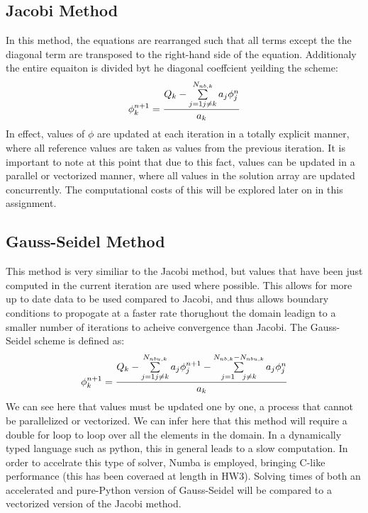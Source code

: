 \documentclass[11pt]{article}
\begin{document}
\subsection{Jacobi Method}
\label{sec-1-2}
In this method, the equations are rearranged such that all terms except the the diagonal term are transposed to the right-hand side of the equation. Additionaly the entire equaiton is divided byt he diagonal coeffcient yeilding the scheme:
\[
\phi_{k}^{n+1} = \frac{Q_{k} - \sum\limits_{j=1 \\ j \neq k}^{N_{nb,k}} a_{j} \phi_{j}^{n}}{a_{k}}
\]
In effect, values of $\phi$ are updated at each iteration in a totally explicit manner, where all reference values are taken as values from the previous iteration. It is important to note at this point that due to this fact, values can be updated in a parallel or vectorized manner, where all values in the solution array are updated concurrently. The computational costs of this will be explored later on in this assignment.

\subsection{Gauss-Seidel Method}
\label{sec-1-3}
This method is very similiar to the Jacobi method, but values that have been just computed in the current iteration are used where possible. This allows for more up to date data to be used compared to Jacobi, and thus allows boundary conditions to propogate at a faster rate thorughout the domain leadign to a smaller number of iterations to acheive convergence than Jacobi. The Gauss-Seidel scheme is defined as:
\[
\phi_{k}^{n+1} = \frac{Q_{k} - \sum\limits_{j=1 \\ j \neq k}^{N_{nbu,k}} a_{j} \phi_{j}^{n+1} - \sum\limits_{j=1 \\ j \neq k}^{N_{nb,k} - N_{nbu,k} } a_{j} \phi_{j}^{n} }{a_{k}}      
\]
We can see here that values must be updated one by one, a process that cannot be parallelized or vectorized. We can infer here that this method will require a double for loop to loop over all the elements in the domain. In a dynamically typed language such as python, this in general leads to a slow computation.  In order to accelrate this type of solver, Numba is employed, bringing C-like performance (this has been coveraed at length in HW3). Solving times of both an accelerated and pure-Python version of Gauss-Seidel will be compared to a vectorized version of the Jacobi method. 
\end{document}
